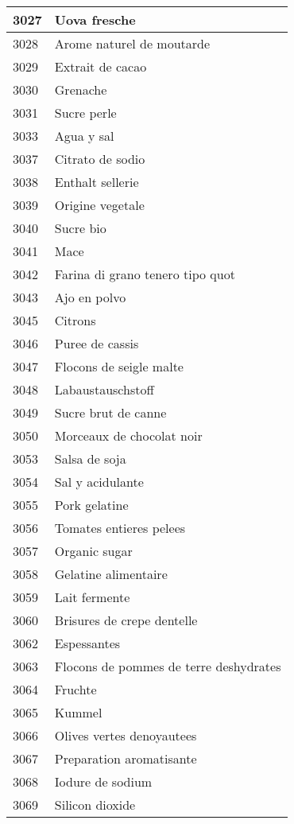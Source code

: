 \begin{longtable}{|l|l|}
3027 & Uova fresche \\ \hline 
3028 & Arome naturel de moutarde \\ \hline 
3029 & Extrait de cacao \\ \hline 
3030 & Grenache \\ \hline 
3031 & Sucre perle \\ \hline 
3033 & Agua y sal \\ \hline 
3037 & Citrato de sodio \\ \hline 
3038 & Enthalt sellerie \\ \hline 
3039 & Origine vegetale \\ \hline 
3040 & Sucre bio \\ \hline 
3041 & Mace \\ \hline 
3042 & Farina di grano tenero tipo quot \\ \hline 
3043 & Ajo en polvo \\ \hline 
3045 & Citrons \\ \hline 
3046 & Puree de cassis \\ \hline 
3047 & Flocons de seigle malte \\ \hline 
3048 & Labaustauschstoff \\ \hline 
3049 & Sucre brut de canne \\ \hline 
3050 & Morceaux de chocolat noir \\ \hline 
3053 & Salsa de soja \\ \hline 
3054 & Sal y acidulante \\ \hline 
3055 & Pork gelatine \\ \hline 
3056 & Tomates entieres pelees \\ \hline 
3057 & Organic sugar \\ \hline 
3058 & Gelatine alimentaire \\ \hline 
3059 & Lait fermente \\ \hline 
3060 & Brisures de crepe dentelle \\ \hline 
3062 & Espessantes \\ \hline 
3063 & Flocons de pommes de terre deshydrates \\ \hline 
3064 & Fruchte \\ \hline 
3065 & Kummel \\ \hline 
3066 & Olives vertes denoyautees \\ \hline 
3067 & Preparation aromatisante \\ \hline 
3068 & Iodure de sodium \\ \hline 
3069 & Silicon dioxide \\ \hline 

\end{longtable}
